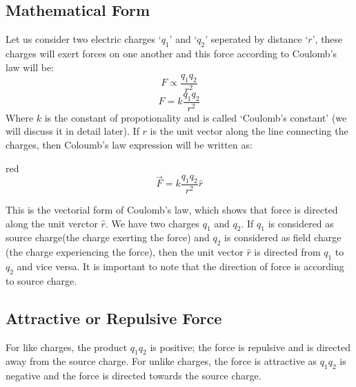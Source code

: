 \subsection*{Mathematical Form}
Let us consider two electric charges `$q_{1}$' and `$q_{2}$' 
seperated by distance `$r$', these charges will exert forces on one another and this 
force according to Coulomb's law will be:
\begin{equation}
  F \propto \frac{q_{1}q_{2}}{r^{2}} \nonumber
\end{equation}
\begin{equation} \label{eq:11.1}
  F = k \frac{q_{1}q_{2}}{r^{2}} 
\end{equation}
Where $k$ is the constant of propotionality and 
is called `Coulomb’s constant' (we will discuss it in detail later). If $r$
is the unit vector along the line connecting the charges, then 
Coloumb’s law expression will be written as:
\begin{mybox}{red}{}
\begin{equation}\label{eq:11.2}
  \vec{F} = k \frac{q_{1}q_{2}}{r^{2}} \hat{r}
\end{equation}
\end{mybox}
This is the vectorial form of Coulomb's law, which shows that force is directed along the unit verctor $\hat{r}$.
We have two charges $q_{1}$ and $q_{2}$. If $q_{1}$ is considered as
source charge(the charge exerting the force) and $q_{2}$ is considered
as field charge (the charge experiencing the force), then the unit vector $\hat{r}$
is directed from $q_{1}$ to $q_{2}$ and vice versa.
It is important to note that the direction of force is according to source charge.
\subsection*{Attractive or Repulsive Force}
For like charges, the product $q_{1}$$q_{2}$ is positive;
the force is repulsive and is directed away from
the source charge. For unlike charges,
the force is attractive as $q_{1}$$q_{2}$ is negative and the force is directed
towards the source charge.
